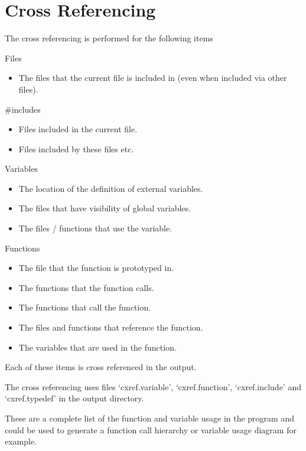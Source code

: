 \section{Cross Referencing}

The cross referencing is performed for the following items
\begin{list}{}{\leftmargin=1in }
\item[Files]
\begin{itemize}
\item The files that the current file is included in
(even when included via other files).
\end{itemize}
\item[\#includes]
\begin{itemize}
\item Files included in the current file.
\item Files included by these files etc.
\end{itemize}
\item[Variables]
\begin{itemize}
\item The location of the definition of external variables.
\item The files that have visibility of global variables.
\item The files / functions that use the variable.
\end{itemize}
\item[Functions]
\begin{itemize}
\item The file that the function is prototyped in.
\item The functions that the function calls.
\item The functions that call the function.
\item The files and functions that reference the function.
\item The variables that are used in the function.
\end{itemize}
\end{list}
Each of these items is cross referenced in the output.

The cross referencing uses files `cxref.variable', `cxref.function',
`cxref.include' and `cxref.typedef' in the output directory.

These are a complete list of the function and variable usage in the program and
could be used to generate a function call hierarchy or variable usage diagram
for example.

